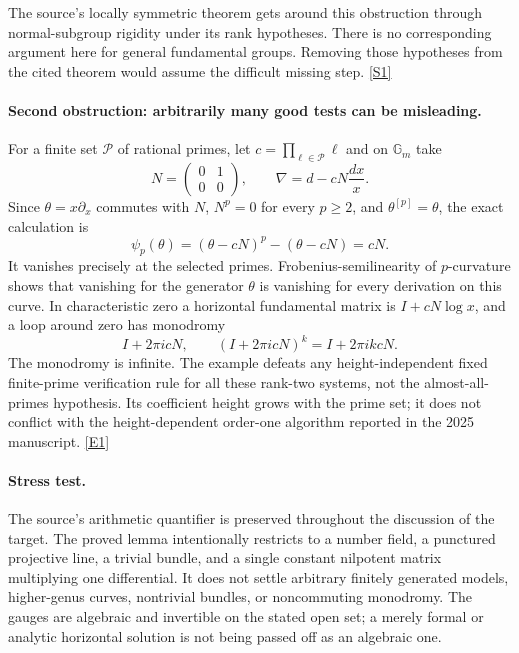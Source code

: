 \documentclass[11pt,a4paper]{article}
\newcommand{\sref}[2]{\hyperlink{source:#1:#2}{[S#2]}}
\newcommand{\eref}[2]{\hyperlink{extra:#1:#2}{[E#2]}}
\numberwithin{equation}{section}
\begin{document}
The source's locally symmetric theorem gets around this obstruction through
normal-subgroup rigidity under its rank hypotheses. There is no corresponding
argument here for general fundamental groups. Removing those hypotheses
from the cited theorem would assume the difficult missing step.
\sref{118}{1}

\paragraph{Second obstruction: arbitrarily many good tests can be misleading.}
For a finite set $\mathcal P$ of rational primes, let
$c=\prod_{\ell\in\mathcal P}\ell$ and on $\mathbb G_m$ take
\[
 N=\begin{pmatrix}0&1\\0&0\end{pmatrix},\qquad
 \nabla=d-cN\frac{dx}{x}.
\]
Since $\theta=x\partial_x$ commutes with $N$, $N^p=0$ for every $p\ge2$, and
$\theta^{[p]}=\theta$, the exact calculation is
\begin{equation}\label{118:finite-test}
 \psi_p(\theta)=(\theta-cN)^p-(\theta-cN)=cN.
\end{equation}
It vanishes precisely at the selected primes. Frobenius-semilinearity of
$p$-curvature shows that vanishing for the generator $\theta$ is vanishing
for every derivation on this curve. In characteristic zero a horizontal
fundamental matrix is $I+cN\log x$, and a loop around zero has monodromy
\[
 I+2\pi i cN,
 \qquad (I+2\pi i cN)^k=I+2\pi i k cN.
\]
The monodromy is infinite. The example defeats any height-independent fixed
finite-prime verification rule for all these rank-two systems, not the
almost-all-primes hypothesis. Its coefficient height grows with the prime
set; it does not conflict with the height-dependent order-one algorithm
reported in the 2025 manuscript. \eref{118}{1}

\paragraph{Stress test.}
The source's arithmetic quantifier is preserved throughout the discussion
of the target. The proved lemma intentionally restricts to a number field,
a punctured projective line, a trivial bundle, and a single constant nilpotent
matrix multiplying one differential. It does not settle arbitrary
finitely generated models, higher-genus curves, nontrivial bundles, or
noncommuting monodromy. The gauges are algebraic and invertible on the
stated open set; a merely formal or analytic horizontal solution is not
being passed off as an algebraic one.
\end{document}
